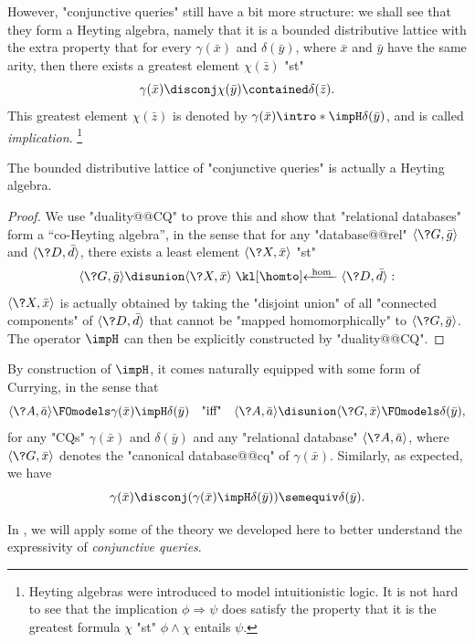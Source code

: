 However, "conjunctive queries" still have a bit more structure: we shall
see that they form a Heyting algebra, namely that it is a bounded distributive lattice
with the extra property that for every $\gamma(\bar x)$ and $\delta(\bar y)$,
where $\bar x$ and $\bar y$ have the same arity, then there exists
a greatest element $\chi(\bar z)$ "st"
\[
	\gamma(\bar x) \disconj \chi(\bar y) \contained \delta(\Bar z). 
\]
This greatest element $\chi(\bar z)$ is denoted by \AP$\gamma(\bar x) \intro*\impH \delta(\bar y)$, and is called \emph{implication}.%
\footnote{Heyting algebras were introduced to model intuitionistic logic.
It is not hard to see that the implication $\phi \Rightarrow \psi$
does satisfy the property that it is the greatest formula $\chi$
"st" $\phi \land \chi$ entails $\psi$.}

\begin{proposition}
	The bounded distributive lattice of "conjunctive queries" is actually
	a Heyting algebra.
\end{proposition}

\begin{proof}
	We use "duality@@CQ" to prove this and show that "relational databases" form a ``co-Heyting algebra'',
	in the sense that for any "database@@rel" $\tup{\?G, \bar g}$ and $\tup{\?D, \bar d}$,
	there exists a least element $\tup{\?X, \bar x}$ "st"
	\[
		\tup{\?G, \bar g} \disunion \tup{\?X, \bar x} \cohomto \tup{\?D, \bar d}:
	\]
	$\tup{\?X, \bar x}$ is actually obtained by taking the "disjoint union"
	of all "connected components" of $\tup{\?D, \bar d}$ 
	that cannot be "mapped homomorphically" to $\tup{\?G, \bar g}$.
	The operator $\impH$ can then be explicitly constructed by "duality@@CQ".
\end{proof}

By construction of $\impH$, it comes naturally equipped with some
form of Currying, in the sense that
\[
	\tup{\?A, \bar a}
	\FOmodels \gamma(\bar x) \impH \delta(\bar y)
	\quad\text{"iff"}\quad
	\tup{\?A, \bar a} \disunion \tup{\?G, \bar x}
	\FOmodels \delta(\bar y),
\]
for any "CQs" $\gamma(\bar x)$ and $\delta(\bar y)$
and any "relational database" $\tup{\?A, \bar a}$,
where $\tup{\?G, \bar x}$ denotes the "canonical database@@cq" of $\gamma(\bar x)$.
Similarly, as expected, we have
\[
	\gamma(\bar x) \disconj (\gamma(\bar x) \impH \delta(\bar y))
	\semequiv
	\delta(\bar y).
\]

In ,
we will apply some of the theory we developed here
to better understand the expressivity of \emph{conjunctive queries}.

